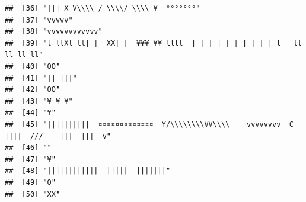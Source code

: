 \documentclass[
]{article}
\begin{document}
\begin{verbatim}
##  [36] "||| X V\\\\ / \\\\/ \\\\ ¥  °°°°°°°"                                                                                                      
##  [37] "vvvvv"                                                                                                                                    
##  [38] "vvvvvvvvvvvv"                                                                                                                             
##  [39] "l llXl ll| |  XX| |  ¥¥¥ ¥¥ llll  | | | | | | | | | | l   ll ll ll ll"                                                                    
##  [40] "OO"                                                                                                                                       
##  [41] "|| |||"                                                                                                                                   
##  [42] "OO"                                                                                                                                       
##  [43] "¥ ¥ ¥"                                                                                                                                    
##  [44] "¥"                                                                                                                                        
##  [45] "||||||||||  ¤¤¤¤¤¤¤¤¤¤¤¤¤  Y/\\\\\\\\VV\\\\    vvvvvvvv  C  ||||  ///    |||  |||  v"                                                     
##  [46] ""                                                                                                                                         
##  [47] "¥"                                                                                                                                        
##  [48] "||||||||||||  |||||  |||||||"                                                                                                             
##  [49] "O"                                                                                                                                        
##  [50] "XX"                                                                                                                                       

\end{verbatim}
\end{document}
